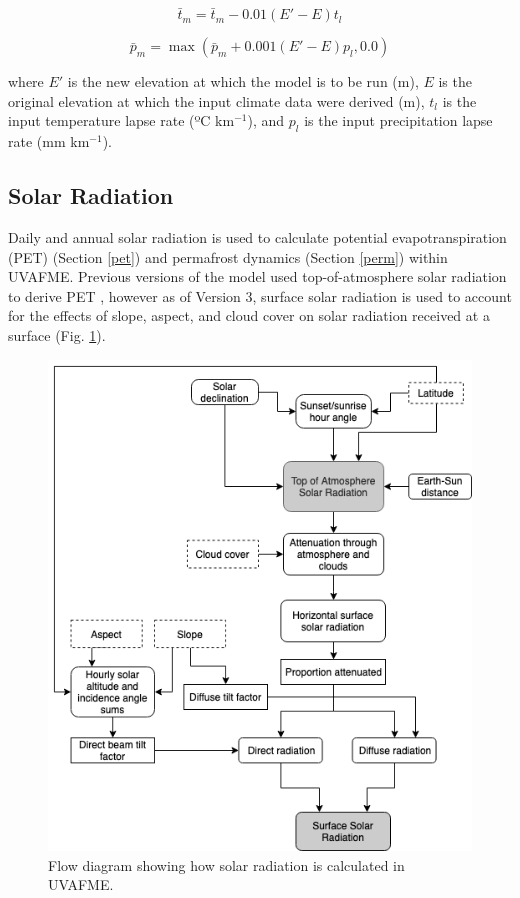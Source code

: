 \documentclass[a4paper, 12pt] {report}
\begin{document}
\begin{equation}
\bar{t}_m = \bar{t}_m - 0.01(E' - E)t_l
\end{equation}

\begin{equation}
\bar{p}_m = \max{(\bar{p}_m + 0.001(E' - E)p_l, 0.0)}
\end{equation}

where $E'$ is the new elevation at which the model is to be run (m), $E$ is the original elevation at which the input climate data were derived (m), $t_l$ is the input temperature lapse rate (ºC km$^{-1}$), and $p_l$ is the input precipitation lapse rate (mm km$^{-1}$).

\subsection{Solar Radiation} \label{solar}
Daily and annual solar radiation is used to calculate potential evapotranspiration (PET) (Section \ref{pet}) and permafrost dynamics (Section \ref{perm}) within UVAFME. Previous versions of the model used top-of-atmosphere solar radiation to derive PET \cite{fosterValidationApplicationForest2017}, however as of Version 3, surface solar radiation is used to account for the effects of slope, aspect, and cloud cover on solar radiation received at a surface (Fig. \ref{fig:solardiagram}). 

\begin{figure}
  \includegraphics[width=0.7\linewidth]{Figures/SolarRadiation.png}
  \caption{Flow diagram showing how solar radiation is calculated in UVAFME.}
  \label{fig:solardiagram}
\end{figure}
\end{document}

